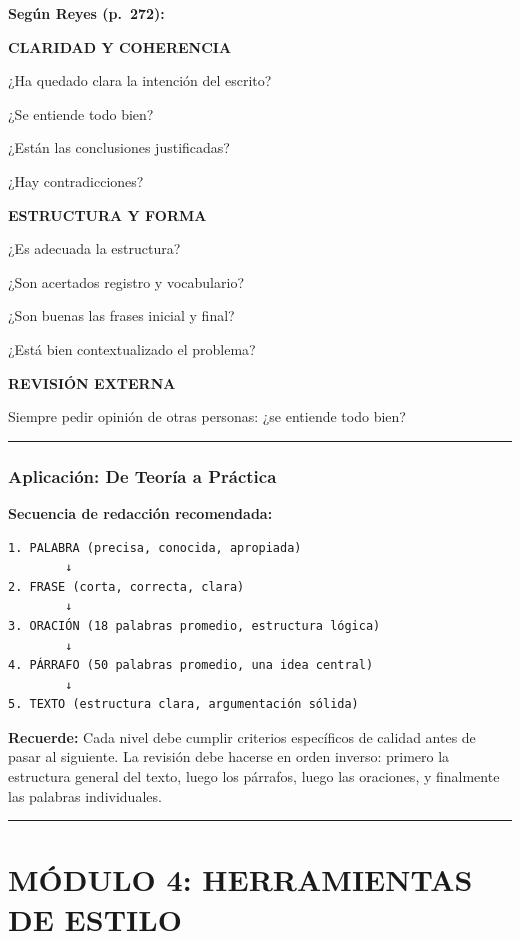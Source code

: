 \documentclass[
  11pt,
]{beaner}
\begin{document}
\textbf{Según Reyes (p.~272):}

\textbf{CLARIDAD Y COHERENCIA}

¿Ha quedado clara la intención del escrito?

¿Se entiende todo bien?

¿Están las conclusiones justificadas?

¿Hay contradicciones?

\textbf{ESTRUCTURA Y FORMA}

¿Es adecuada la estructura?

¿Son acertados registro y vocabulario?

¿Son buenas las frases inicial y final?

¿Está bien contextualizado el problema?

\textbf{REVISIÓN EXTERNA}

Siempre pedir opinión de otras personas: ¿se entiende todo bien?

\begin{center}\rule{0.5\linewidth}{0.5pt}\end{center}

\subsubsection{Aplicación: De Teoría a
Práctica}\label{aplicaciuxf3n-de-teoruxeda-a-pruxe1ctica}

\textbf{Secuencia de redacción recomendada:}

\begin{verbatim}
1. PALABRA (precisa, conocida, apropiada)
        ↓
2. FRASE (corta, correcta, clara)
        ↓
3. ORACIÓN (18 palabras promedio, estructura lógica)
        ↓
4. PÁRRAFO (50 palabras promedio, una idea central)
        ↓
5. TEXTO (estructura clara, argumentación sólida)
\end{verbatim}

\textbf{Recuerde:} Cada nivel debe cumplir criterios específicos de
calidad antes de pasar al siguiente. La revisión debe hacerse en orden
inverso: primero la estructura general del texto, luego los párrafos,
luego las oraciones, y finalmente las palabras individuales.

\begin{center}\rule{0.5\linewidth}{0.5pt}\end{center}

\section{MÓDULO 4: HERRAMIENTAS DE
ESTILO}\label{muxf3dulo-4-herramientas-de-estilo}
\end{document}
